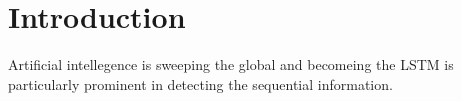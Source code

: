 \section{Introduction}
Artificial intellegence is sweeping the global and becomeing the 
LSTM is particularly prominent in detecting the sequential information. 